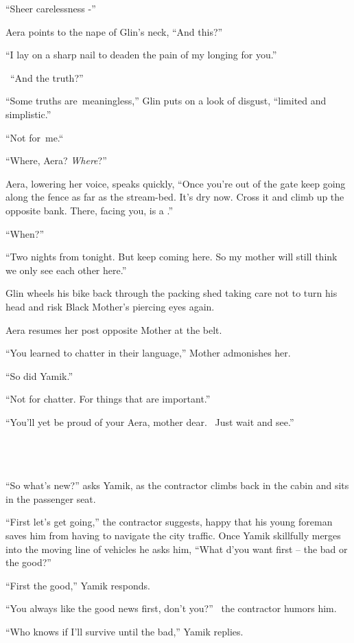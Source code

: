 \documentclass[twoside,11pt]{book}
\begin{document}
``Sheer carelessness -''

Aera points to the nape of Glin's neck, ``And this?''

``I lay on a sharp nail to deaden the pain of my longing for you.''

~``And the truth?''

``Some truths are~meaningless,'' Glin puts on a look of disgust, ``limited and
simplistic.''

``Not for~me.``~

``Where, Aera? \textit{Where}?''

Aera, lowering her voice, speaks quickly, ``Once you're out of the gate keep going along the fence as far
as the stream-bed. It's dry now. Cross it and climb up the opposite bank. There, facing you, is a .''

``When?''

``Two nights from tonight. But keep coming here. So my mother will still think we only see each other
here.''

Glin wheels his bike back through the packing shed taking care not to turn his head and risk Black Mother's piercing
eyes again.

Aera resumes her post opposite Mother at the belt.

``You learned to chatter in their language,'' Mother admonishes her.

``So did Yamik.''

``Not for chatter. For things that are important.''

``You'll yet be proud of your Aera, mother dear.~ Just wait and see.''

~

\chapter{}

``So what's new?'' asks Yamik, as the contractor climbs back in the cabin and sits in the
passenger seat.

``First let's get going,'' the contractor suggests, happy that his young foreman saves him
from having to navigate the city traffic. Once Yamik skillfully merges into the moving line of vehicles he asks him,
``What d'you want first -- the bad or the good?''

``First the good,'' Yamik responds.

``You always like the good news first, don't you?'' \ the contractor humors him.

``Who knows if I'll survive until the bad,'' Yamik replies.{ }
\end{document}
